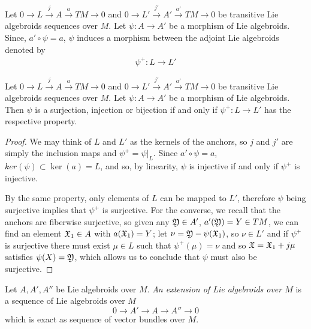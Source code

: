 \begin{definition}\label{defnPhi+}
Let $0 \to L \xrightarrow{j} A \xrightarrow{a} TM \to 0$ and $0 \to L' \xrightarrow{j'} A' \xrightarrow{a'} TM \to 0$ be transitive Lie algebroids sequences over $M$. Let $\psi: A \to A'$ be a morphism of Lie algebroids. Since, $a' \circ \psi = a$, $\psi$ induces a morphism between the adjoint Lie algebroids denoted by
\begin{align*}
    \psi^+: L \to L'
\end{align*}
\end{definition}

\begin{proposition}
Let $0 \to L \xrightarrow{j} A \xrightarrow{a} TM \to 0$ and $0 \to L' \xrightarrow{j'} A' \xrightarrow{a'} TM \to 0$ be transitive Lie algebroids sequences over $M$. Let $\psi: A \to A'$ be a morphism of Lie algebroids. Then $\psi$ is a surjection, injection or bijection if and only if $\psi^+: L \to L'$ has the respective property.
\end{proposition}

\begin{proof}
We may think of $L$ and $L'$ as the kernels of the anchors, so $j$ and $j'$ are simply the inclusion maps and $\psi^+ = \psi|_L$. Since $a' \circ \psi = a$, $ker(\psi) \subset \ker(a) = L$, and so, by linearity, $\psi$ is injective if and only if $\psi^+$ is injective.

By the same property, only elements of $L$ can be mapped to $L'$, therefore $\psi$ being surjective implies that $\psi^+$ is surjective. For the converse, we recall that the anchors are fiberwise surjective, so given any $\mathfrak{Y} \in A'$, $a'(\mathfrak{Y}) = Y \in TM$, we can find an element $\mathfrak{X}_1 \in A$ with $a(\mathfrak{X}_1) = Y$; let $\nu = \mathfrak{Y} - \psi(\mathfrak{X}_1)$, so $\nu \in L'$ and if $\psi^+$ is surjective there must exist $\mu \in L$ such that $\psi^+(\mu) = \nu$ and so $\mathfrak{X} = \mathfrak{X}_1 + j\mu$ satisfies $\psi(X) = \mathfrak{Y}$, which allows us to conclude that $\psi$ must also be surjective.
\end{proof}


\linea

\begin{definition} 
Let $A, A', A''$ be Lie algebroids over $M$. \emph{An extension of Lie algebroids over $M$} is a sequence of Lie algebroids over $M$ \[ 0 \to A' \to A \to A'' \to 0 \] which is exact as sequence of vector bundles over $M$.
\end{definition}

